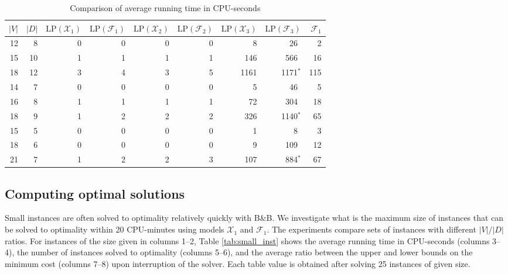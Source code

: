 \begin{table}[h!]
\centering
\setlength{\tabcolsep}{6pt} %
\renewcommand{\arraystretch}{1.4} %
\begin{tabular}{rrrrrrrrr}
 $|V|$ & $|D|$ & $\text{LP}(\mathcal{X}_1)$ & $\text{LP}(\mathcal{F}_1)$ & $\text{LP}(\mathcal{X}_2)$ & $\text{LP}(\mathcal{F}_2)$ & $\text{LP}(\mathcal{X}_3)$ & $\text{LP}(\mathcal{F}_3)$ & $\mathcal{F}_1$\\ \hline
  12 & 8       & 0   & 0   & 0     & 0     & 8    & 26\textcolor{white}{$^*$}   & 2   \\
  15 & 10      & 1   & 1   & 1     & 1     & 146  & 566\textcolor{white}{$^*$}  & 16  \\
  18 & 12      & 3   & 4   & 3     & 5     & 1161 & 1171$^*$                    & 115 \\\hline
  14 & 7       & 0   & 0   & 0     & 0     & 5    & 46\textcolor{white}{$^*$}   & 5   \\ 
  16 & 8       & 1   & 1   & 1     & 1     & 72   & 304\textcolor{white}{$^*$}  & 18  \\
  18 & 9       & 1   & 2   & 2     & 2     & 326  & 1140$^*$                    & 65  \\ \hline
  15 & 5       & 0   & 0   & 0     & 0     & 1    & 8\textcolor{white}{$^*$}    & 3   \\ 
  18 & 6       & 0   & 0   & 0     & 0     & 9    & 109\textcolor{white}{$^*$}  & 12  \\ 
  21 & 7       & 1   & 2   & 2     & 3     & 107  & 884$^*$                     & 67
\end{tabular}
\caption{Comparison of average running time in CPU-seconds}
\label{tab:small_inst_time}
\end{table}

\subsection{Computing optimal solutions}
\label{sec:expsmall}

Small instances are often solved to optimality relatively quickly with B\&B.
We investigate what is the maximum size of instances that can be solved to optimality within 20 CPU-minutes using models $\mathcal{X}_1$ and $\mathcal{F}_1$.
The experiments compare sets of instances with different $|V|/|D|$ ratios.
For instances of the size given in columns 1--2, Table \ref{tab:small_inst} shows the average running time in CPU-seconds (columns 3--4),
the number of instances solved to optimality (columns 5--6),
and the average ratio between the upper and lower bounds on the minimum cost (columns 7--8) upon interruption of the solver.
Each table value is obtained after solving 25 instances of given size.


